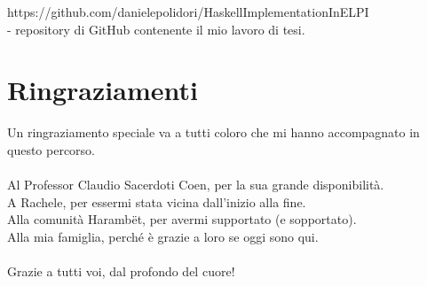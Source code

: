 \documentclass[12pt,a4paper,openright,twoside]{report}
\begin{document}


\begin{thebibliography}{90}		%


 https://github.com/danielepolidori/HaskellImplementationInELPI\\
- repository di GitHub contenente il mio lavoro di tesi.

\end{thebibliography}

\clearpage{\pagestyle{empty}\cleardoublepage}	%


\chapter*{Ringraziamenti}

\thispagestyle{empty}

Un ringraziamento speciale va a tutti coloro che mi hanno accompagnato in questo percorso.\\
\\
Al Professor Claudio Sacerdoti Coen, per la sua grande disponibilità.\\
A Rachele, per essermi stata vicina dall'inizio alla fine.\\
Alla comunità Haramb\"{e}t, per avermi supportato (e sopportato).\\
Alla mia famiglia, perché è grazie a loro se oggi sono qui.\\
\\
Grazie a tutti voi, dal profondo del cuore!
\end{document}
